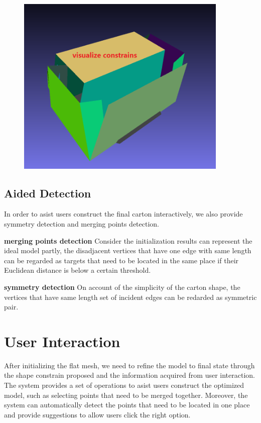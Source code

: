 \documentclass[submission]{gmp2018}
\begin{document}
{}

\begin{figure}
	\centering
	\includegraphics[width=0.9\textwidth]{images/constrains.png}
	\caption{}
	\label{fig:constrain}
\end{figure}


\subsection{Aided Detection}
In order to asist users construct the final carton interactively, we also provide symmetry detection and merging points detection.

\noindent
\textbf{merging points detection} Consider the initialization results can represent the ideal model partly, the disadjacent vertices that have one edge with same length can be regarded as targets that need to be located in the same place if their Euclidean distance is below a certain threshold.

\noindent
\textbf{symmetry detection} On account of the simplicity of the carton shape, the vertices that have same length set of incident edges can be redarded as symmetric pair.


\section{User Interaction}\label{sec:interaction}
After initializing the flat mesh, we need to refine the model to final state through the shape constrain proposed and the information acquired from user interaction. The system provides a set of operations to asist users construct the optimized model, such as selecting points that need to be merged together. Moreover, the system can automatically detect the points that need to be located in one place and provide suggestions to allow users click the right option.
\end{document}
